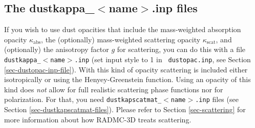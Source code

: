 \documentclass{report}
\begin{document}
 
\subsection{The dustkappa\_$<$name$>$.inp files}
\label{sec-dustkappa-files}
%
If you wish to use dust opacities that include the mass-weighted absorption
opacity $\kappa_{\mathrm{abs}}$, the (optionally) mass-weighted scattering
opacity $\kappa_{\mathrm{scat}}$, and (optionally) the anisotropy factor $g$
for scattering, you can do this with a file {\small\tt
  dustkappa\_$<$name$>$.inp} (set input style to 1 in {\small\tt
  dustopac.inp}, see Section \ref{sec-dustopac-inp-file}). With this kind of
opacity scattering is included either isotropically or using the
Henyey-Greenstein function.  Using an opacity of this kind does {\em not}
allow for full realistic scattering phase functions nor for
polarization. For that, you need {\small\tt dustkapscatmat\_$<$name$>$.inp}
files (see Section \ref{sec-dustkapscatmat-files}). Please refer to Section
\ref{sec-scattering} for more information about how RADMC-3D treats
scattering.
\end{document}
